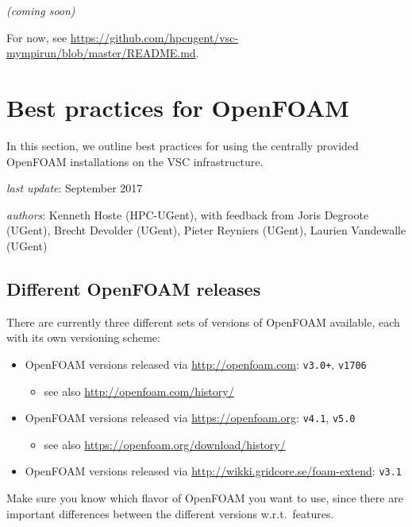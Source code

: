 \textit{(coming soon)}

For now, see {\small\url{https://github.com/hpcugent/vsc-mympirun/blob/master/README.md}}.


\section{Best practices for OpenFOAM}
\label{sec:best-practices-openfoam}

In this section, we outline best practices for using the centrally provided OpenFOAM installations
on the VSC \hpc infrastructure.

\textit{last update}: September 2017

\textit{authors}: Kenneth Hoste (HPC-UGent), with feedback from Joris Degroote (UGent), Brecht Devolder (UGent),
                  Pieter Reyniers (UGent), Laurien Vandewalle (UGent)


\subsection{Different OpenFOAM releases}
\label{sec:best-practices-openfoam-releases}

There are currently three different sets of versions of OpenFOAM available, each with its own versioning scheme:

\begin{itemize}
    \item OpenFOAM versions released via \url{http://openfoam.com}: {\small\texttt{v3.0+}}, {\small\texttt{v1706}}
    \begin{itemize}
        \item see also \url{http://openfoam.com/history/}
    \end{itemize}
    \item OpenFOAM versions released via \url{https://openfoam.org}: {\small\texttt{v4.1}}, {\small\texttt{v5.0}}
    \begin{itemize}
        \item see also \url{https://openfoam.org/download/history/}
    \end{itemize}
    \item OpenFOAM versions released via \url{http://wikki.gridcore.se/foam-extend}: {\small\texttt{v3.1}}
\end{itemize}

Make sure you know which flavor of OpenFOAM you want to use, since there are important differences between
the different versions w.r.t.\ features.

